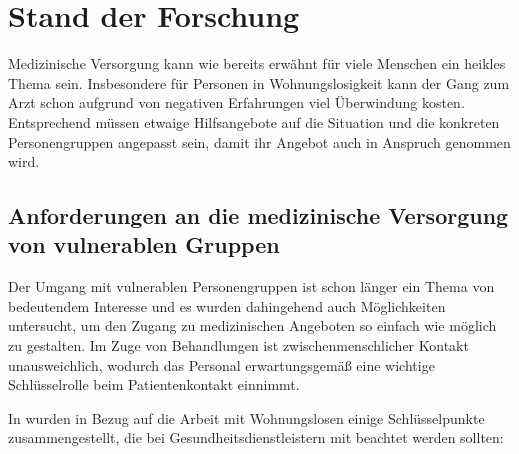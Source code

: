 \chapter{Stand der Forschung}\label{ch:relatedWork}

Medizinische Versorgung kann wie bereits erwähnt für viele Menschen ein heikles Thema sein. Insbesondere für Personen in Wohnungslosigkeit kann der Gang zum Arzt schon aufgrund von negativen Erfahrungen viel Überwindung kosten. Entsprechend müssen etwaige Hilfsangebote auf die Situation und die konkreten Personengruppen angepasst sein, damit ihr Angebot auch in Anspruch genommen wird.

\section{Anforderungen an die medizinische Versorgung von vulnerablen Gruppen}

Der Umgang mit vulnerablen Personengruppen ist schon länger ein Thema von bedeutendem Interesse und es wurden dahingehend auch Möglichkeiten untersucht, um den Zugang zu medizinischen Angeboten so einfach wie möglich zu gestalten. Im Zuge von Behandlungen ist zwischenmenschlicher Kontakt unausweichlich, wodurch das Personal erwartungsgemäß eine wichtige Schlüsselrolle beim Patientenkontakt einnimmt.

In \citet{Hwang.2014} wurden in Bezug auf die Arbeit mit Wohnungslosen einige Schlüsselpunkte zusammengestellt, die bei Gesundheitsdienstleistern mit beachtet werden sollten:


